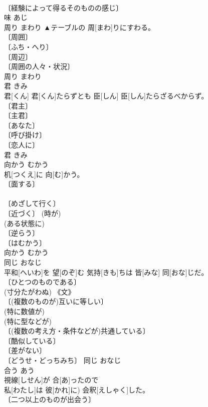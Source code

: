 \documentclass[8pt]{extreport}
\begin{document}
\begin{CJK}{UTF8}{min}
\\	〔経験によって得るそのものの感じ〕 
\\	味	あじ	
\\	周り	まわり	▲テーブルの 周[まわ]りにすわる。	
\\	〔周囲〕 
\\	〔ふち・へり〕 
\\	〔周辺〕 
\\	〔周囲の人々・状況〕 
\\	周り	まわり	
\\	君	きみ	
\\	君[くん] 君[くん]たらずとも 臣[しん] 臣[しん]たらざるべからず。	
\\	〔君主〕 
\\	〔主君〕 
\\	〔あなた〕 
\\	〔呼び掛け〕 
\\	〔恋人に〕 
\\	君	きみ	
\\	向かう	むかう	
\\	机[つくえ]に 向[む]かう。	
\\	〔面する〕 
\\	[＝めんする] 
\\	〔めざして行く〕 
\\	〔近づく〕 (時が) 
\\	(ある状態に) 
\\	〔逆らう〕 
\\	〔はむかう〕 
\\	向かう	むかう	
\\	同じ	おなじ	
\\	平和[へいわ]を 望[のぞ]む 気持[きも]ちは 皆[みな] 同[おな]じだ。	
\\	〔ひとつのものである〕 
\\	(寸分たがわぬ) 《文》 
\\	〔(複数のものが)互いに等しい〕 
\\	(特に数値が) 
\\	(特に型などが) 
\\	〔(複数の考え方・条件などが)共通している〕 
\\	〔酷似している〕 
\\	〔差がない〕 
\\	〔どうせ・どっちみち〕	同じ	おなじ	
\\	合う	あう	
\\	視線[しせん]が 合[あ]ったので
\\	私[わたし]は 彼[かれ]に) 会釈[えしゃく]した。	
\\	〔二つ以上のものが出会う〕 

\end{CJK}
\end{document}

